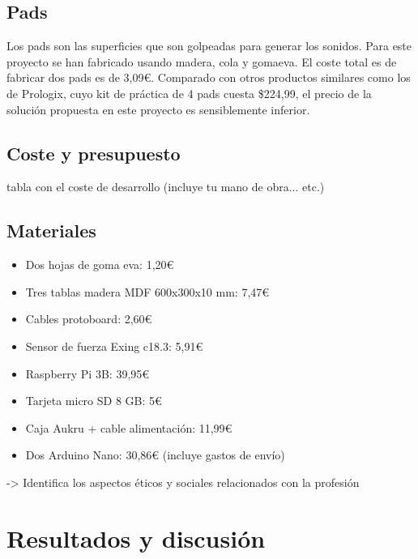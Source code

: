\documentclass{article}
\begin{document}
 \subsection{Pads}
 Los pads son las superficies que son golpeadas para generar los sonidos. Para este proyecto se han fabricado
 usando madera, cola y gomaeva\cite{GomaEva}. El coste total es de fabricar dos pads es de 3,09\euro{}. Comparado
 con otros productos similares como los de Prologix\cite{practice_pad}, cuyo kit de práctica de 4 pads cuesta
 \$224,99, el precio de la solución propuesta en este proyecto es sensiblemente inferior.

 \subsection{Coste y presupuesto}

  tabla con el coste de desarrollo (incluye tu mano de obra... etc.)

  \subsection{Materiales}
  \begin{itemize}
      \item Dos hojas de goma eva: 1,20\euro{}
      \item Tres tablas madera MDF 600x300x10 mm: 7,47\euro{}
      \item Cables protoboard: 2,60\euro{}
      \item Sensor de fuerza Exing c18.3: 5,91\euro{}
      \item Raspberry Pi 3B: 39,95\euro{}
      \item Tarjeta micro SD 8 GB: 5\euro{}
      \item Caja Aukru + cable alimentación: 11,99\euro{}
      \item Dos Arduino Nano: 30,86\euro{} (incluye gastos de envío)
  \end{itemize}

->  Identifica los aspectos éticos y sociales relacionados con la profesión

\section{Resultados y discusión}\label{sec:ResultadosDisc}
\end{document}
